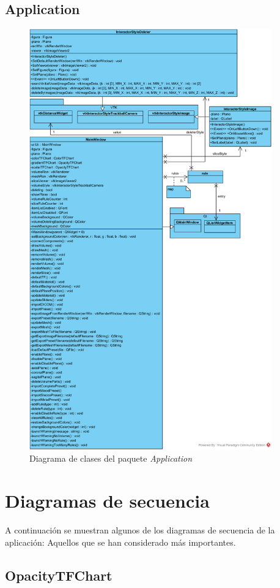 \subsection{Application}

\begin{figure}[H]
	\centering
	\includegraphics[width=10.5cm]{imagenes/diagramas/clases/Application}
	\caption{Diagrama de clases del paquete \textit{Application}}
	\label{fig:diagrama_clases_application}
\end{figure}

\section{Diagramas de secuencia}

A continuación se muestran algunos de los diagramas de secuencia de la aplicación: Aquellos que se han considerado más importantes.

\subsection{OpacityTFChart}


